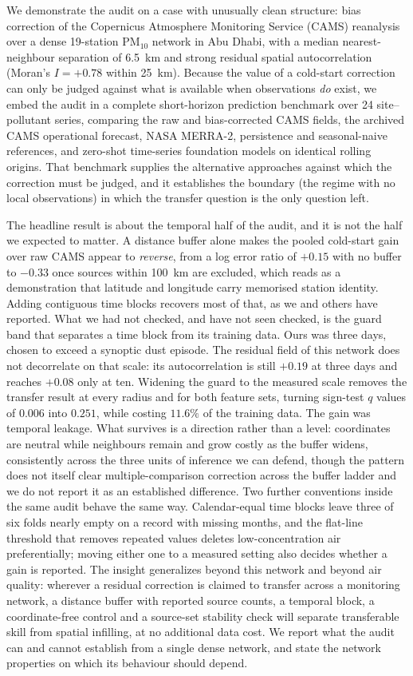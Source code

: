 \documentclass[review,times,authoryear]{elsarticle}
\newcommand*{\pmten}{\ensuremath{\mathrm{PM_{10}}}}
\begin{document}
We demonstrate the audit on a case with unusually clean structure: bias correction of the
Copernicus Atmosphere Monitoring Service (CAMS) reanalysis over a dense 19-station
\pmten{} network in Abu Dhabi, with a median nearest-neighbour separation of 6.5~km and
strong residual spatial autocorrelation (Moran's $I=+0.78$ within 25~km). Because the
value of a cold-start correction can only be judged against what is available when
observations \emph{do} exist, we embed the audit in a complete short-horizon prediction
benchmark over 24 site--pollutant series, comparing the raw and bias-corrected CAMS
fields, the archived CAMS operational forecast, NASA MERRA-2, persistence and
seasonal-naive references, and zero-shot time-series foundation models on identical
rolling origins. That benchmark supplies the alternative approaches against which the
correction must be judged, and it establishes the boundary (the regime with no local
observations) in which the transfer question is the only question left.

The headline result is about the temporal half of the audit, and it is not the half we
expected to matter. A distance buffer alone makes the pooled cold-start gain over raw
CAMS appear to \emph{reverse}, from a log error ratio of $+0.15$ with no buffer to $-0.33$
once sources within 100~km are excluded, which reads as a demonstration that latitude and
longitude carry memorised station identity. Adding contiguous time blocks recovers most of
that, as we and others have reported. What we had not checked, and have not seen checked,
is the guard band that separates a time block from its training data. Ours was three days,
chosen to exceed a synoptic dust episode. The residual field of this network does not
decorrelate on that scale: its autocorrelation is still $+0.19$ at three days and reaches
$+0.08$ only at ten. Widening the guard to the measured scale removes the transfer result
at every radius and for both feature sets, turning sign-test $q$ values of $0.006$ into
$0.251$, while costing $11.6\%$ of the training data. The gain was temporal leakage. What
survives is a direction rather than a level: coordinates are neutral while neighbours
remain and grow costly as the buffer widens, consistently across the three units of
inference we can defend, though the pattern does not itself clear multiple-comparison
correction across the buffer ladder and we do not report it as an established difference.
Two further conventions inside the same audit behave the same way. Calendar-equal time
blocks leave three of six folds nearly empty on a record with missing months, and the
flat-line threshold that removes repeated values deletes low-concentration air
preferentially; moving either one to a measured setting also decides whether a gain is
reported.
The insight generalizes beyond this network and beyond air quality: wherever a residual
correction is claimed to transfer across a monitoring network, a distance buffer with
reported source counts, a temporal block, a coordinate-free control and a source-set
stability check will
separate transferable skill from spatial infilling, at no additional data cost. We report
what the audit can and cannot establish from a single dense network, and state the
network properties on which its behaviour should depend.
\end{document}

